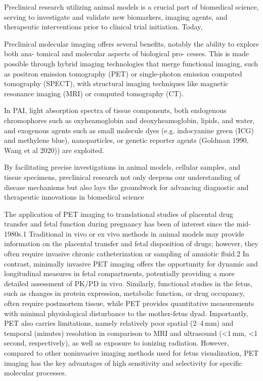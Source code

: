 Preclinical research utilizing animal models is a crucial part of biomedical science, serving to investigate and validate new biomarkers, imaging agents, and therapeutic interventions prior to clinical trial initiation. Today,


Preclinical molecular imaging offers several
benefits, notably the ability to explore both ana- tomical and molecular aspects of biological pro- cesses. This is made possible through hybrid imaging
technologies that merge functional imaging, such as positron emission tomography (PET)
or single-photon emission computed
tomography (SPECT), with structural imaging techniques
like magnetic resonance imaging
(MRI) or computed tomography (CT).


In PAI, light absorption spectra of tissue components, both endogenous chromophores such as
oxyheamoglobin and deoxyheamoglobin, lipids, and water, and exogenous agents such as small molecule dyes (e.g. indocyanine green (ICG) and methylene blue), nanoparticles, or genetic reporter agents (Goldman 1990, Wang et al 2020)) are exploited.

By facilitating precise investigations in animal models, cellular samples, and tissue specimens, preclinical research not only deepens our understanding of disease mechanisms but also lays the groundwork for advancing diagnostic and therapeutic innovations in biomedical science


The application of PET imaging to translational studies of placental drug transfer and fetal function during pregnancy has been of interest since the mid-1980s.1 Traditional in vivo or ex vivo methods in animal models may provide information on the placental transfer and fetal disposition of drugs; however, they often require invasive chronic catheterization or sampling of amniotic fluid.2 In contrast, minimally invasive PET imaging offers the opportunity for dynamic and longitudinal measures in fetal compartments, potentially providing a more detailed assessment of PK/PD in vivo. Similarly, functional studies in the fetus, such as changes in protein expression, metabolic function, or drug occupancy, often require postmortem tissue, while PET provides quantitative measurements with minimal physiological disturbance to the mother-fetus dyad. Importantly, PET also carries limitations, namely relatively poor spatial (2–4 mm) and temporal (minutes) resolution in comparison to MRI and ultrasound (<1 mm, <1 second, respectively), as well as exposure to ionizing radiation. However, compared to other noninvasive imaging methods used for fetus visualization, PET imaging has the key advantages of high sensitivity and selectivity for specific molecular processes.